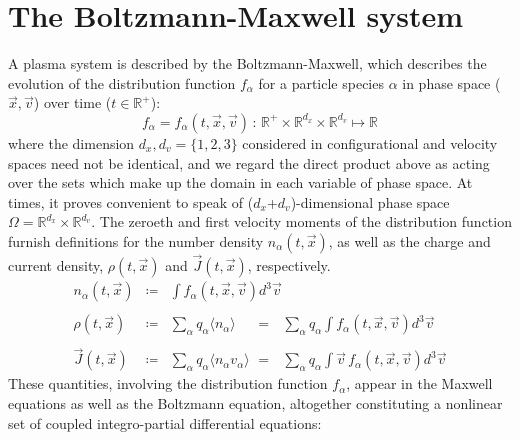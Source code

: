 \documentclass[11pt,titlepage]{report}
\begin{document}
\section{The Boltzmann-Maxwell system}

\indent \indent A plasma system is described by the Boltzmann-Maxwell, which describes the evolution of the distribution function $f_{\alpha}$ for a particle species $\alpha$ in phase space ($\vec{x},\vec{v}$) over time ($t\in\mathbb{R^+}$):
$$f_{\alpha} = f_{\alpha}(t,\vec{x},\vec{v}) \, : \, \mathbb{R}^+ \times \mathbb{R}^{d_x} \times \mathbb{R}^{d_v} \mapsto \mathbb{R}$$
\noindent where the dimension $d_x,d_v = \{1,2,3\}$ considered in configurational and velocity spaces need not be identical, and we regard the direct product above as acting over the sets which make up the domain in each variable of phase space. At times, it proves convenient to speak of ($d_x$+$d_v$)-dimensional phase space $\Omega = \mathbb{R}^{d_x} \times \mathbb{R}^{d_v}$. The zeroeth and first velocity moments of the distribution function furnish definitions for the number density $n_{\alpha}(t,\vec{x})$, as well as the charge and current density, $\rho (t,\vec{x})$ and $\vec{J}(t,\vec{x})$, respectively.
\begin{eqnarray}
n_{\alpha}(t,\vec{x}) & \coloneqq & \int f_{\alpha}(t,\vec{x},\vec{v})d^3\vec{v}\\
&&\nonumber\\
\rho (t,\vec{x}) & \coloneqq & \sum_{\alpha} q_{\alpha} \langle n_{\alpha}\rangle\quad\,\, = \,\,\,\,\sum_{\alpha} q_{\alpha}\int f_{\alpha}(t,\vec{x},\vec{v}) d^3\vec{v} \\
&&\nonumber\\
\vec{J}(t,\vec{x}) & \coloneqq & \sum_{\alpha} q_{\alpha}\langle n_{\alpha} v_{\alpha}\rangle\,\,  =\,\,\,\, \sum_{\alpha} q_{\alpha} \int \vec{v}\,f_{\alpha}(t,\vec{x},\vec{v}) d^3\vec{v}
\end{eqnarray}
\noindent These quantities, involving the distribution function $f_{\alpha}$, appear in the Maxwell equations as well as the Boltzmann equation, altogether constituting a nonlinear set of coupled integro-partial differential equations:
\end{document}
